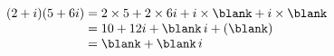 {\renewcommand{\arraystretch}{1.3}$\begin{array}{@{}r@{}l@{}} (2+i)(5+6i) & {}=2\times 5+2\times 6i+i\times\blank+i\times\blank \\ & {}=10+12i+\blank\,i+(\blank) \\ & {}=\blank+\blank\,i \end{array}$}
